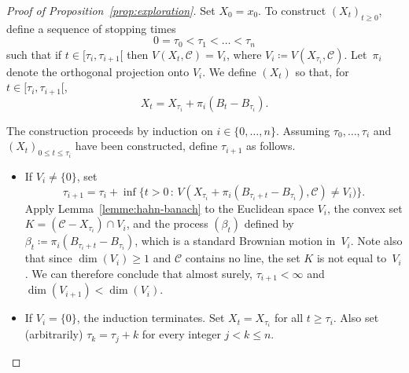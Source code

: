 \documentclass[12pt]{amsart}
\newcommand{\iy}{\infty}
\renewcommand{\leq}{\leqslant}
\renewcommand{\geq}{\geqslant}
\theoremstyle{plain}
\theoremstyle{remark}
\begin{document}
\begin{proof}[Proof of Proposition~\ref{prop:exploration}]
Set $X_0=x_0$. To construct $(X_t)_{t \geq 0}$, define a sequence of stopping times
\[ 0 = \tau_0 < \tau_1 < \dots < \tau_n \]
such that if $t \in [\tau_i,\tau_{i+1}[$ then $V(X_t,\mathscr{C}) = V_i$, where $V_i \coloneqq V(X_{\tau_{i}},\mathscr{C})$.
Let~$\pi_i$ denote the orthogonal projection onto $V_i$. We define $(X_t)$ so that, for $t \in [\tau_i,\tau_{i+1}[$,
\[ X_t = X_{\tau_i}+ \pi_i(B_t-B_{\tau_{i}}) .\]
 
The construction proceeds by induction on $i \in \{0,\dots,n\}$. Assuming $\tau_0,\dots,\tau_{i}$ and $(X_t)_{0 \leq t \leq \tau_{i}}$ have been constructed, define $\tau_{i+1}$ as follows.
\begin{itemize}
\item If $V_i \neq \{0\}$, set
\[ \tau_{i+1} = \tau_{i} + \inf \{ t > 0 \, : \, V(X_{\tau_{i}} + \pi_i(B_{\tau_i+t} - B_{\tau_{i}}),\mathscr{C}) \neq V_i) \} .\]
Apply Lemma~\ref{lemme:hahn-banach} to the Euclidean space $V_i$, the convex set $K = (\mathscr{C}-X_{\tau_i}) \cap V_i$, and the process $(\beta_t)$ defined by $\beta_t \coloneqq \pi_i(B_{\tau_i+t} - B_{\tau_{i}})$, which is a standard Brownian motion in~$V_i$. Note also that since $\dim (V_i) \geq 1$ and $\mathscr{C}$ contains no line, the set $K$ is not equal to~$V_i$. We can therefore conclude that almost surely, $\tau_{i+1} < \iy $ and $\dim (V_{i+1}) < \dim(V_i)$.
\item If $V_i= \{0\}$, the induction terminates. Set $X_t = X_{\tau_i}$ for all $t \geq \tau_i$. Also set
(arbitrarily) $\tau_{k}=\tau_j+k$ for every integer $j < k \leq n$.
\end{itemize}
 

\end{proof}
\end{document}
